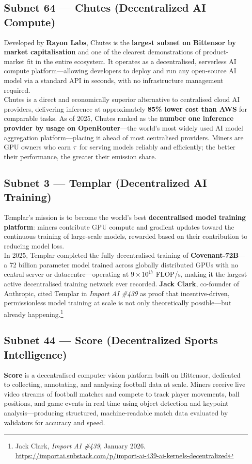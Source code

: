 \documentclass[12pt, a4paper, oneside]{report}
\newcommand{\TAO}{$\tau$}            %
\theoremstyle{definition}
\begin{document}
\subsection*{Subnet 64 — Chutes (Decentralized AI Compute)}
Developed by \textbf{Rayon Labs}, Chutes is the \textbf{largest subnet on 
Bittensor by market capitalisation} and one of the clearest demonstrations 
of product-market fit in the entire ecosystem. It operates as a decentralised, 
serverless AI compute platform—allowing developers to deploy and run any 
open-source AI model via a standard API in seconds, with no infrastructure 
management required.\\[0.4cm]

Chutes is a direct and economically superior alternative to centralised cloud 
AI providers, delivering inference at approximately \textbf{85\% lower cost 
than AWS} for comparable tasks. As of 2025, Chutes ranked as the 
\textbf{number one inference provider by usage on OpenRouter}—the world's 
most widely used AI model aggregation platform—placing it ahead of most  
centralised providers. Miners are 
GPU owners who earn \TAO\ for serving models reliably and efficiently; 
the better their performance, the greater their emission share.

\subsection*{Subnet 3 — Templar (Decentralized AI Training)}
Templar's mission is to become the world's best \textbf{decentralised model 
training platform}: miners contribute GPU compute and gradient updates toward 
the continuous training of large-scale models, rewarded based on their 
contribution to reducing model loss.\\[0.4cm]

In 2025, Templar completed the fully decentralised training of 
\textbf{Covenant-72B}—a 72 billion parameter model trained across globally 
distributed GPUs with no central server or datacentre—operating at 
$9 \times 10^{17}$ FLOP/s, making it the largest active decentralised 
training network ever recorded. \textbf{Jack Clark}, co-founder of Anthropic, 
cited Templar in \textit{Import AI \#439} as proof that incentive-driven, 
permissionless model training at scale is not only theoretically possible—but 
already happening.\footnote{Jack Clark, \textit{Import AI \#439}, January 2026. 
\url{https://importai.substack.com/p/import-ai-439-ai-kernels-decentralized}}


\subsection*{Subnet 44 — Score (Decentralized Sports Intelligence)}
\textbf{Score} is a decentralised computer vision platform built on Bittensor, 
dedicated to collecting, annotating, and analysing football data at scale. 
Miners receive live video streams of football matches and compete to track 
player movements, ball positions, and game events in real time using object 
detection and keypoint analysis—producing structured, machine-readable 
match data evaluated by validators for accuracy and speed.\\[0.4cm]
\end{document}
